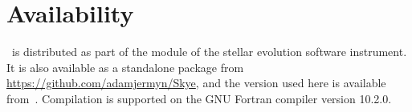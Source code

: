 \section{Availability} \label{sec:avail}

\skye\ is distributed as part of the  module of the  stellar evolution software instrument.
It is also available as a standalone package from \url{https://github.com/adamjermyn/Skye}, and the version used here is available from~\citet{adam_s_jermyn_2021_4641111}.
Compilation is supported on the GNU Fortran compiler version 10.2.0.
